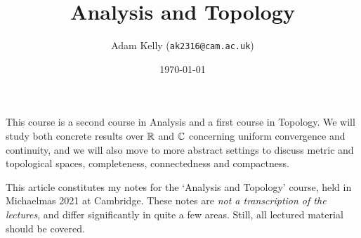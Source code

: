 \documentclass[a4paper]{scrartcl}
\title{Analysis and Topology}
\author{Adam Kelly (\texttt{ak2316@cam.ac.uk})}
\date{\today}
\begin{document}
\maketitle

This course is a second course in Analysis and a first course in Topology. 
We will study both concrete results over $\mathbb{R}$ and $\mathbb{C}$ concerning uniform convergence and continuity, and we will also move to more abstract settings to discuss metric and topological spaces, completeness, connectedness and compactness.

This article constitutes my notes for the `Analysis and Topology' course, held in Michaelmas 2021 at Cambridge. These notes are \emph{not a transcription of the lectures}, and differ significantly in quite a few areas. Still, all lectured material should be covered.



\tableofcontents






\end{document}
